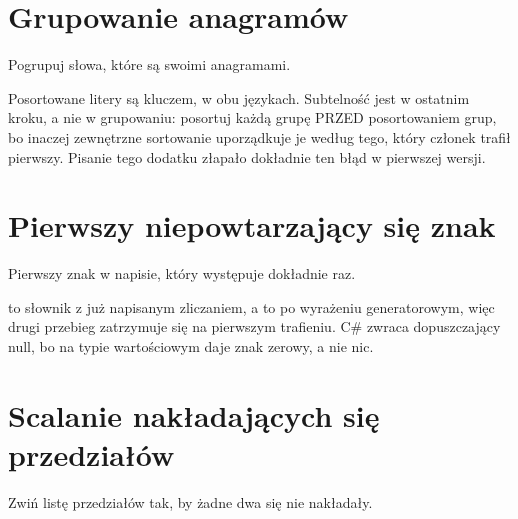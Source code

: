 \section{Grupowanie anagramów}
\label{sec:appD-anagrams}

\noindent
Pogrupuj słowa, które są swoimi anagramami.



\noindent
Posortowane litery są kluczem, w obu językach. Subtelność jest w ostatnim kroku, a nie w grupowaniu: posortuj każdą grupę PRZED posortowaniem grup, bo inaczej zewnętrzne sortowanie uporządkuje je według tego, który członek trafił pierwszy. Pisanie tego dodatku złapało dokładnie ten błąd w pierwszej wersji.

\section{Pierwszy niepowtarzający się znak}
\label{sec:appD-first-unique}

\noindent
Pierwszy znak w napisie, który występuje dokładnie raz.



\noindent
{} to słownik z już napisanym zliczaniem, a  to  po wyrażeniu generatorowym, więc drugi przebieg zatrzymuje się na pierwszym trafieniu. C\# zwraca  dopuszczający null, bo  na typie wartościowym daje znak zerowy, a nie nic.

\section{Scalanie nakładających się przedziałów}
\label{sec:appD-merge}

\noindent
Zwiń listę przedziałów tak, by żadne dwa się nie nakładały.



